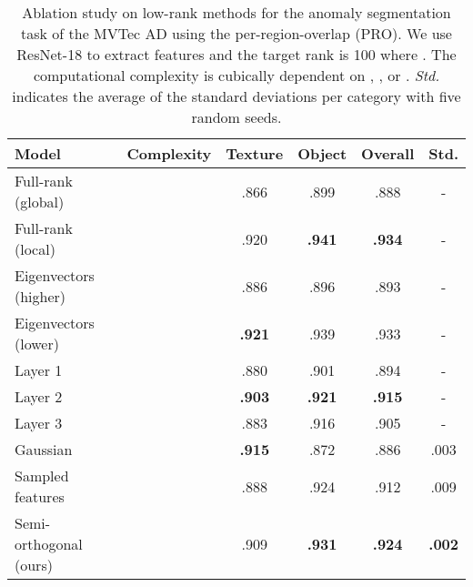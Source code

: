 \begin{table*}
  \centering
  \caption{Ablation study on low-rank methods for the anomaly segmentation task of the MVTec AD using the per-region-overlap (PRO). We use ResNet-18 to extract features and the target rank  is 100 where . The computational complexity is cubically dependent on , , or . \textit{Std.} indicates the average of the standard deviations per category with five random seeds. 
} 
  \label{tbl:ablation_lowrank}
  \begin{tabular}{lccccc}
  \toprule
  Model                             & Complexity & Texture   & Object    & Overall   & Std. \\ \midrule
  Full-rank (global)           &   & .866      & .899      & .888      & -    \\ 
  Full-rank (local)            & & .920      & \bf{.941} & \bf{.934} & -    \\ 
  Eigenvectors (higher)             & & .886      & .896      & .893      & -    \\
  Eigenvectors (lower)              & & \bf{.921} & .939      & .933      & -    \\ \midrule


  Layer 1                           && .880      & .901      & .894      & -    \\ 
  Layer 2                           && \bf{.903} & \bf{.921} & \bf{.915} & -    \\ 
  Layer 3                           && .883      & .916      & .905      & -    \\ \midrule

  Gaussian                          &  & \bf{.915} & .872      & .886      & .003      \\
  Sampled features~\cite{Defard2020}&  & .888      & .924      & .912      & .009      \\
Semi-orthogonal (ours)            &  & .909      & \bf{.931} & \bf{.924} & \bf{.002} \\
  \bottomrule
  \end{tabular}
\end{table*}

